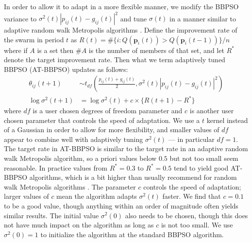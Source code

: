 \documentclass[12pt]{article}
\begin{document}
In order to allow it to adapt in a more flexible manner, we modify the BBPSO variance to $\sigma^2(t)|p_{ij}(t) - g_{ij}(t)|^2$ and tune $\sigma(t)$ in a manner similar to adaptive random walk Metropolis algorithms \citep{andrieu2008tutorial}. Define the improvement rate of the swarm in period $t$ as $R(t) = \#\{i:Q(\bm{p}_i(t))> Q(\bm{p}_i(t-1))\}/n$ where if $A$ is a set then $\#A$ is the number of members of that set, and let $R^*$ denote the target improvement rate. Then what we term adaptively tuned BBPSO (AT-BBPSO) updates as follows:
\begin{align}\label{eq:at-bbpso}
\theta_{ij}(t+1) &\sim t_{df}\left(\frac{p_{ij}(t) + g_{ij}(t)}{2}, \sigma^2(t)|p_{ij}(t) - g_{ij}(t)|^2\right)\nonumber\\
\log \sigma^2(t+1) &= \log\sigma^2(t) + c\times\{R(t+1) - R^*\}
\end{align}
where $df$ is a user chosen degrees of freedom parameter and $c$ is another user chosen parameter that controls the speed of adaptation. We use a $t$ kernel instead of a Gaussian in order to allow for more flexibility, and smaller values of $df$ appear to combine well with adaptively tuning $\sigma^2(t)$ --- in particular $df=1$. The target rate in AT-BBPSO is similar to the target rate in an adaptive random walk Metropolis algorithm, so a priori values below $0.5$ but not too small seem reasonable. In practice values from $R^*=0.3$ to $R^*=0.5$ tend to yield good AT-BBPSO algorithms, which is a bit higher than usually recommend for random walk Metropolis algorithms \citep{gelman1996efficient}. The parameter $c$ controls the speed of adaptation; larger values of $c$ mean the algorithm adapts $\sigma^2(t)$ faster. We find that $c=0.1$ to be a good value, though anything within an order of magnitude often yields similar results. The initial value $\sigma^2(0)$ also needs to be chosen, though this does not have much impact on the algorithm as long as $c$ is not too small. We use $\sigma^2(0)=1$ to initialize the algorithm at the standard BBPSO algorithm.
\end{document}
